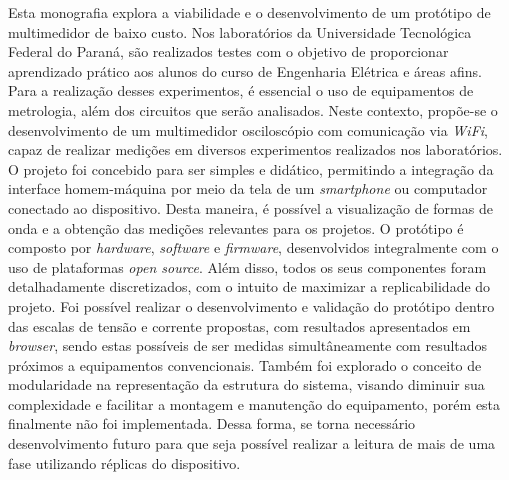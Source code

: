 

\begin{resumoutfpr}%
Esta monografia explora a viabilidade e o desenvolvimento de um protótipo de multimedidor de baixo custo. Nos laboratórios da Universidade Tecnológica Federal do Paraná, são realizados testes com o objetivo de proporcionar aprendizado prático aos alunos do curso de Engenharia Elétrica e áreas afins. Para a realização desses experimentos, é essencial o uso de equipamentos de metrologia, além dos circuitos que serão analisados.
Neste contexto, propõe-se o desenvolvimento de um multimedidor osciloscópio com comunicação via \textit{WiFi}, capaz de realizar medições em diversos experimentos realizados nos laboratórios. O projeto foi concebido para ser simples e didático, permitindo a integração da interface homem-máquina por meio da tela de um \textit{smartphone} ou computador conectado ao dispositivo. Desta maneira, é possível a visualização de formas de onda e a obtenção das medições relevantes para os projetos.
O protótipo é composto por \textit{hardware}, \textit{software} e \textit{firmware}, desenvolvidos integralmente com o uso de plataformas \textit{open source}. Além disso, todos os seus componentes foram detalhadamente discretizados, com o intuito de maximizar a replicabilidade do projeto.
Foi possível realizar o desenvolvimento e validação do protótipo dentro das escalas de tensão e corrente propostas, com resultados apresentados em \textit{browser}, sendo estas possíveis de ser medidas simultâneamente com resultados próximos a equipamentos convencionais.  
Também foi explorado o conceito de modularidade na representação da estrutura do sistema, visando diminuir sua complexidade e facilitar a montagem e manutenção do equipamento, porém esta finalmente não foi implementada. Dessa forma, se torna necessário desenvolvimento futuro para que seja possível realizar a leitura de mais de uma fase utilizando réplicas do dispositivo.
\end{resumoutfpr}

